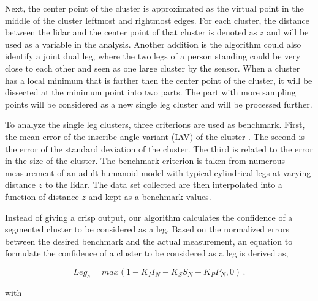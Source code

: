 \documentclass[10 pt,a4paper,conference]{IEEEtran}
\begin{document}
Next, the center point of the cluster is approximated as the virtual
point in the middle of the cluster leftmost and rightmost edges. For
each cluster, the distance between the lidar and the center point of
that cluster is denoted as \(z\) and will be used as a variable in the
analysis. Another addition is the algorithm could also identify a joint dual leg, where the two legs of a person standing could be very close to each other and seen as one large cluster by the sensor. When a cluster has a local minimum that is farther then the center point of the cluster, it will be dissected at the minimum point into two parts. The part with more
sampling points will be considered as a new single leg cluster and will be processed further. 



To analyze the single leg clusters, three criterions are used as
benchmark. First, the mean error of the inscribe angle variant (IAV) of
the cluster \citep{DBLP:conf/icra/XavierPCRN05}. The second is the error
of the standard deviation of the cluster. The third is related to the
error in the size of the cluster.
The benchmark criterion is taken from numerous measurement of an adult
humanoid model with typical cylindrical legs at varying distance \(z\)
to the lidar. The data set collected are then interpolated into a
function of distance \(z\) and kept as a benchmark values.

Instead of giving a crisp output, our
algorithm calculates the confidence of a segmented cluster to be
considered as a leg. Based on the normalized errors between the desired benchmark and
the actual measurement, an equation to formulate the confidence of a
cluster to be considered as a leg is derived as,

\begin{equation}
Leg_{c}=max(1-K_II_N-K_SS_N-K_PP_N,0)\,. \label{eq:cost}
\end{equation}

with
\end{document}
